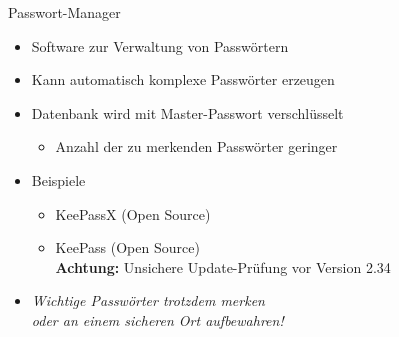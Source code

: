 \begin{frame}{Passwort-Manager}
  \begin{itemize}
    \item Software zur Verwaltung von Passwörtern
    \item Kann automatisch komplexe Passwörter erzeugen
    \item Datenbank wird mit Master-Passwort verschlüsselt
    \begin{itemize}
      \item Anzahl der zu merkenden Passwörter geringer
    \end{itemize}
    \item Beispiele
    \begin{itemize}
      \item KeePassX (Open Source)
      \item KeePass (Open Source)\\
        \textbf{Achtung:} Unsichere Update-Prüfung vor Version 2.34
    \end{itemize}
  \end{itemize}
  \begin{itemize}
    \item \emph{Wichtige Passwörter trotzdem merken\\oder an einem sicheren Ort aufbewahren!}
  \end{itemize}
\end{frame}

\endinput
